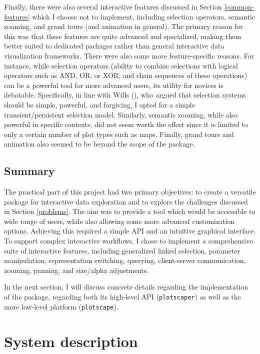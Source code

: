 \documentclass[
  openany]{book}
\theoremstyle{definition}
\theoremstyle{definition}
\theoremstyle{definition}
\theoremstyle{definition}
\theoremstyle{remark}
\begin{document}
Finally, there were also several interactive features discussed in Section \ref{common-features} which I choose not to implement, including selection operators, semantic zooming, and grand tours (and animation in general). The primary reason for this was that these features are quite advanced and specialized, making them better suited to dedicated packages rather than general interactive data visualization frameworks. There were also some more feature-specific reasons. For instance, while selection operators (ability to combine selections with logical operators such as AND, OR, or XOR, and chain sequences of these operations) can be a powerful tool for more advanced users, its utility for novices is debatable. Specifically, in line with Wills (), who argued that selection systems should be simple, powerful, and forgiving, I opted for a simple transient/persistent selection model. Similarly, semantic zooming, while also powerful in specific contexts, did not seem worth the effort since it is limited to only a certain number of plot types such as maps. Finally, grand tours and animation also seemed to be beyond the scope of the package.

\section{Summary}\label{summary-2}

The practical part of this project had two primary objectives: to create a versatile package for interactive data exploration and to explore the challenges discussed in Section \ref{problems}. The aim was to provide a tool which would be accessible to wide range of users, while also allowing some more advanced customization options. Achieving this required a simple API and an intuitive graphical interface. To support complex interactive workflows, I chose to implement a comprehensive suite of interactive features, including generalized linked selection, parameter manipulation, representation switching, querying, client-server communication, zooming, panning, and size/alpha adjustments.

In the next section, I will discuss concrete details regarding the implementation of the package, regarding both its high-level API (\texttt{plotscaper}) as well as the more low-level platform (\texttt{plotscape}).

\chapter{System description}\label{system}
\end{document}
